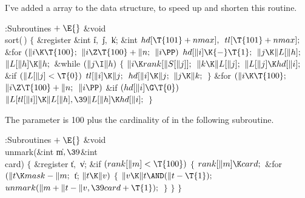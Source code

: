 I've added a  array to the data structure, to
speed up and shorten
this routine.

\Y\B\4:Subroutines\X${}\mathrel+\E{}$\6
\&{void} \\{sort}(\,)\1\1\2\2\6
${}\{{}$\1\6
\&{register} \&{int} \|i${},{}$ \|j${},{}$ \|k;\6
\&{int} ${}\\{hd}[\T{101}+\\{nmax}],{}$ ${}\\{tl}[\T{101}+\\{nmax}];{}$\7
\&{for} ${}(\|i\K\T{100};{}$ ${}\|i\Z\T{100}+\|n;{}$ ${}\|i\PP){}$\1\5
${}\\{hd}[\|i]\K{-}\T{1};{}$\2\6
${}\|j\K\|L[\|h];{}$\6
${}\|L[\|h]\K\|h;{}$\6
\&{while} ${}(\|j\I\|h){}$\5
${}\{{}$\1\6
${}\|i\K\\{rank}[\|S[\|j]];{}$\6
${}\|k\K\|L[\|j];{}$\6
${}\|L[\|j]\K\\{hd}[\|i];{}$\6
\&{if} ${}(\|L[\|j]<\T{0}){}$\1\5
${}\\{tl}[\|i]\K\|j;{}$\2\6
${}\\{hd}[\|i]\K\|j;{}$\6
${}\|j\K\|k;{}$\6
\4${}\}{}$\2\6
\&{for} ${}(\|i\K\T{100};{}$ ${}\|i\Z\T{100}+\|n;{}$ ${}\|i\PP){}$\1\6
\&{if} ${}(\\{hd}[\|i]\G\T{0}){}$\1\5
${}\|L[\\{tl}[\|i]]\K\|L[\|h],\39\|L[\|h]\K\\{hd}[\|i];{}$\2\2\6
\4${}\}{}$\2\par
\fi

The parameter  is 100 plus the cardinality
of 
in the following subroutine.

\Y\B\4:Subroutines\X${}\mathrel+\E{}$\6
\&{void} \\{unmark}(\&{int} \|m${},\39{}$\&{int} \\{card})\1\1\2\2\6
${}\{{}$\1\6
\&{register} \|t${},{}$ \|v;\7
\&{if} ${}(\\{rank}[\|m]<\T{100}){}$\5
${}\{{}$\1\6
${}\\{rank}[\|m]\K\\{card};{}$\6
\&{for} ${}(\|t\K\\{mask}-\|m;{}$ \|t; ${}\|t\K\|v){}$\5
${}\{{}$\1\6
${}\|v\K\|t\AND(\|t-\T{1});{}$\6
${}\\{unmark}(\|m+\|t-\|v,\39\\{card}+\T{1});{}$\6
\4${}\}{}$\2\6
\4${}\}{}$\2\6
\4${}\}{}$\2\par
\fi

